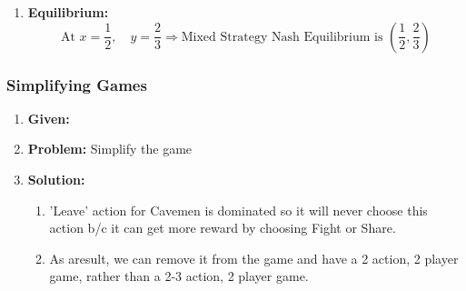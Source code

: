 \begin{example}
\begin{enumerate}
\begin{enumerate}
            \item \textbf{Equilibrium:}
            \[
            \text{At } x = \frac{1}{2}, \quad y = \frac{2}{3} \Rightarrow \text{Mixed Strategy Nash Equilibrium is } \left( \frac{1}{2}, \frac{2}{3} \right)
            \]
        \end{enumerate}
    
    \end{enumerate}
\end{example}
\newpage

\subsubsection{Simplifying Games}
\begin{example}
    \begin{enumerate}
        \item \textbf{Given:} 
        \item \textbf{Problem:} Simplify the game 
        \item \textbf{Solution:}
        \begin{enumerate}
            \item 'Leave' action for Cavemen is dominated so it will never choose this action b/c it can get more reward by choosing Fight or Share. 
            \item As aresult, we can remove it from the game and have a 2 action, 2 player game, rather than a 2-3 action, 2 player game.
        \end{enumerate}
    \end{enumerate}
\end{example}

